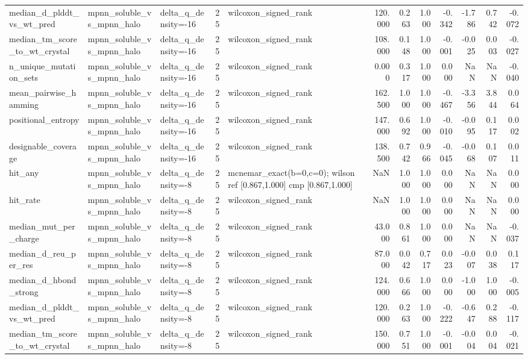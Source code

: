 \begin{table}
{\begin{tabular}{lllrlrrrrrrr}
median\_d\_plddt\_vs\_wt\_pred & mpnn\_soluble\_vs\_mpnn\_halo & delta\_q\_density=-16 & 25 & wilcoxon\_signed\_rank & 120.000 & 0.263 & 1.000 & -0.342 & -1.786 & 0.742 & -0.072 \\
median\_tm\_score\_to\_wt\_crystal & mpnn\_soluble\_vs\_mpnn\_halo & delta\_q\_density=-16 & 25 & wilcoxon\_signed\_rank & 108.000 & 0.148 & 1.000 & -0.001 & -0.025 & 0.003 & -0.027 \\
n\_unique\_mutation\_sets & mpnn\_soluble\_vs\_mpnn\_halo & delta\_q\_density=-16 & 25 & wilcoxon\_signed\_rank & 0.000 & 0.317 & 1.000 & 0.000 & NaN & NaN & -0.040 \\
mean\_pairwise\_hamming & mpnn\_soluble\_vs\_mpnn\_halo & delta\_q\_density=-16 & 25 & wilcoxon\_signed\_rank & 162.500 & 1.000 & 1.000 & -0.467 & -3.356 & 3.844 & 0.064 \\
positional\_entropy & mpnn\_soluble\_vs\_mpnn\_halo & delta\_q\_density=-16 & 25 & wilcoxon\_signed\_rank & 147.000 & 0.692 & 1.000 & -0.010 & -0.095 & 0.117 & 0.002 \\
designable\_coverage & mpnn\_soluble\_vs\_mpnn\_halo & delta\_q\_density=-16 & 25 & wilcoxon\_signed\_rank & 138.500 & 0.742 & 0.966 & -0.045 & -0.068 & 0.107 & 0.011 \\
hit\_any & mpnn\_soluble\_vs\_mpnn\_halo & delta\_q\_density=-8 & 25 & mcnemar\_exact(b=0,c=0); wilson ref [0.867,1.000] cmp [0.867,1.000] & NaN & 1.000 & 1.000 & 0.000 & NaN & NaN & 0.000 \\
hit\_rate & mpnn\_soluble\_vs\_mpnn\_halo & delta\_q\_density=-8 & 25 & wilcoxon\_signed\_rank & NaN & 1.000 & 1.000 & 0.000 & NaN & NaN & 0.000 \\
median\_mut\_per\_charge & mpnn\_soluble\_vs\_mpnn\_halo & delta\_q\_density=-8 & 25 & wilcoxon\_signed\_rank & 43.000 & 0.861 & 1.000 & 0.000 & NaN & NaN & -0.037 \\
median\_d\_reu\_per\_res & mpnn\_soluble\_vs\_mpnn\_halo & delta\_q\_density=-8 & 25 & wilcoxon\_signed\_rank & 87.000 & 0.042 & 0.717 & 0.023 & -0.007 & 0.038 & 0.117 \\
median\_d\_hbond\_strong & mpnn\_soluble\_vs\_mpnn\_halo & delta\_q\_density=-8 & 25 & wilcoxon\_signed\_rank & 124.000 & 0.666 & 1.000 & 0.000 & -1.000 & 1.000 & -0.005 \\
median\_d\_plddt\_vs\_wt\_pred & mpnn\_soluble\_vs\_mpnn\_halo & delta\_q\_density=-8 & 25 & wilcoxon\_signed\_rank & 120.000 & 0.263 & 1.000 & -0.222 & -0.647 & 0.288 & -0.117 \\
median\_tm\_score\_to\_wt\_crystal & mpnn\_soluble\_vs\_mpnn\_halo & delta\_q\_density=-8 & 25 & wilcoxon\_signed\_rank & 150.000 & 0.751 & 1.000 & -0.001 & -0.004 & 0.004 & -0.021 \\

\end{tabular}}
\end{table}

